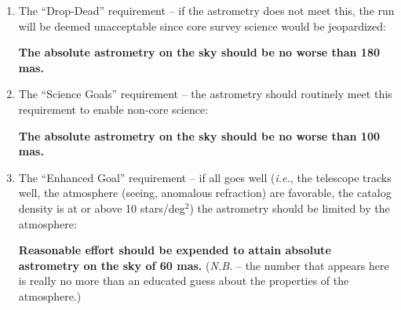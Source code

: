 \begin{enumerate}
\item The ``Drop-Dead'' requirement -- if the astrometry does not meet
this, the run will be deemed unacceptable since core survey science
would be jeopardized:

{\bf The absolute astrometry on the sky should be no worse than
180 mas.}

\item The ``Science Goals'' requirement -- the astrometry should routinely
meet this requirement to enable non-core science:

{\bf The absolute astrometry on the sky should be no worse than
100 mas.}

\item The ``Enhanced Goal'' requirement -- if all goes well ({\it i.e.},
the telescope tracks well, the atmosphere (seeing, anomalous refraction)
are favorable, the catalog density is at or above 10 stars/deg$^2$) the
astrometry should be limited by the atmosphere: 

{\bf Reasonable effort should be expended to attain absolute astrometry
on the sky of 60 mas.}
({\it N.B.} -- the number that appears here is really no more than an
educated guess about the properties of the atmosphere.)
\end {enumerate}

